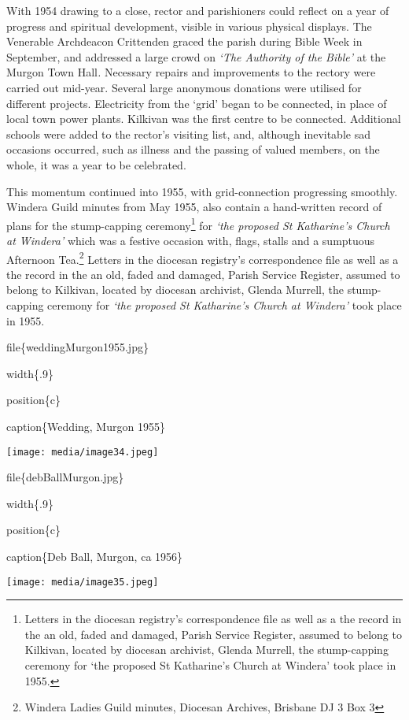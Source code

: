 With 1954 drawing to a close, rector and parishioners could reflect on a year of progress and spiritual development, visible in various physical displays. The Venerable Archdeacon Crittenden graced the parish during Bible Week in September, and addressed a large crowd on \emph{`The Authority of the Bible'} at the Murgon Town Hall\emph{.} Necessary repairs and improvements to the rectory were carried out mid-year. Several large anonymous donations were utilised for different projects. Electricity from the `grid' began to be connected, in place of local town power plants. Kilkivan was the first centre to be connected. Additional schools were added to the rector's visiting list, and, although inevitable sad occasions occurred, such as illness and the passing of valued members, on the whole, it was a year to be celebrated.

This momentum continued into 1955, with grid-connection progressing smoothly. Windera Guild minutes from May 1955, also contain a hand-written record of plans for the stump-capping ceremony\footnote{Letters in the diocesan registry's correspondence file as well as a the record in the an old, faded and damaged, Parish Service Register, assumed to belong to Kilkivan, located by diocesan archivist, Glenda Murrell, the stump-capping ceremony for `the proposed St Katharine's Church at Windera' took place in 1955.} for \emph{`the proposed St Katharine's Church at Windera'} which was a festive occasion with, flags, stalls and a sumptuous Afternoon Tea.\footnote{Windera Ladies Guild minutes, Diocesan Archives, Brisbane DJ 3 Box 3} Letters in the diocesan registry's correspondence file as well as a the record in the an old, faded and damaged, Parish Service Register, assumed to belong to Kilkivan, located by diocesan archivist, Glenda Murrell, the stump-capping ceremony for \emph{`the proposed St Katharine's Church at Windera'} took place in 1955.

file\{weddingMurgon1955.jpg\}

width\{.9\}

position\{c\}

caption\{Wedding, Murgon 1955\}

\texttt{[image: media/image34.jpeg]}

file\{debBallMurgon.jpg\}

width\{.9\}

position\{c\}

caption\{Deb Ball, Murgon, ca 1956\}

\texttt{[image: media/image35.jpeg]}

